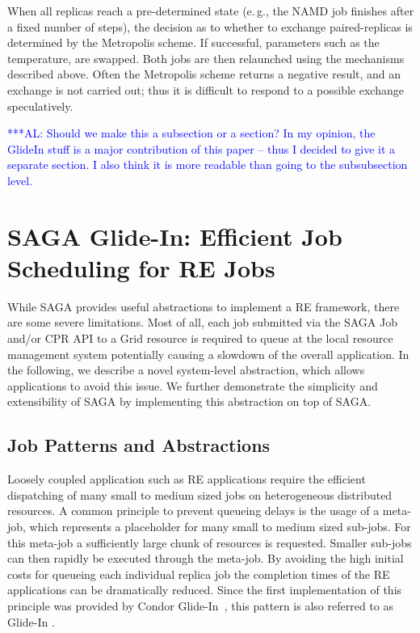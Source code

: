 \documentclass{rspublic}
\newcommand{\alnote}[1]{ {\textcolor{blue} { ***AL: #1 }}}
\newcommand{\jhanote}[1]{ {\textcolor{red} { ***SJ: #1 }}}
\newcommand{\alnote}[1]{}
\newcommand{\jhanote}[1]{}
\newcommand{\glidein}[1]{Glide-In }
\begin{document}
When all replicas reach a pre-determined state (e.\,g., the NAMD job finishes 
after a fixed number of steps), the decision as to whether to exchange
paired-replicas is determined by the Metropolis scheme. If successful,
parameters such as the temperature, are swapped. Both jobs are then
relaunched using the mechanisms described above. Often the Metropolis
scheme returns a negative result, and an exchange is not carried out;
thus it is difficult to respond to a possible exchange speculatively. 
                      
           
\alnote{Should we make this a subsection or a section? In my opinion,
the GlideIn stuff is a major contribution of this paper -- thus I decided to
give it a separate section. I also think it is more readable than going to the
subsubsection level.}           
\section{SAGA Glide-In: Efficient Job Scheduling for RE Jobs}

While SAGA provides useful abstractions to implement a RE framework, there
are some severe limitations. Most of all, each job submitted via the
SAGA Job and/or CPR API to a Grid resource is required to queue at the local 
resource management system potentially causing a slowdown of the overall application. 
In the following, we describe a novel system-level abstraction, which allows 
applications to avoid this issue. We further demonstrate the simplicity and 
extensibility of SAGA by implementing this abstraction on top of SAGA.



\subsection{Job Patterns and Abstractions} 



Loosely coupled application such as RE applications require the efficient
dispatching of many small to medium sized jobs on heterogeneous distributed resources.
A common principle to prevent queueing delays is the usage of a meta-job, which
represents a placeholder for many small to medium sized sub-jobs. For this meta-job a
sufficiently large chunk of resources is requested. Smaller sub-jobs can then rapidly 
be executed through the meta-job.
By avoiding the high initial costs for queueing each individual 
replica job the completion times of the RE applications can be dramatically
reduced. Since the first implementation of this principle was provided by Condor 
Glide-In~\citep{citeulike:291860}, this pattern is also referred to as \glidein\ .
\end{document}
